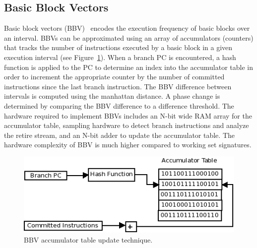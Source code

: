 \subsection{Basic Block Vectors}

Basic block vectors (BBV)~\cite{Sherwood:2003:DEP} encodes the execution frequency of basic blocks over an interval. BBVs can be approximated using an array of accumulators (counters) that tracks the number of instructions executed by a basic block in a given execution interval (see Figure~\ref{fig:bbv}). When a branch PC is encountered, a hash function is applied to the PC to determine an index into the accumulator table in order to increment the appropriate counter by the number of committed instructions since the last branch instruction. The BBV difference between intervals is computed using the manhattan distance. A phase change is determined by comparing the BBV difference to a difference threshold. The hardware required to implement BBVs includes an N-bit wide RAM array for the accumulator table, sampling hardware to detect branch instructions and analyze the retire stream, and an N-bit adder to update the accumulator table. The hardware complexity of BBV is much higher compared to working set signatures. 

\begin{figure}[htbp]
  \begin{center}
\includegraphics[width=0.80\columnwidth]{figs/bbv}
  \end{center}
  \caption{BBV accumulator table update technique.}
  \label{fig:bbv}
\end{figure}
